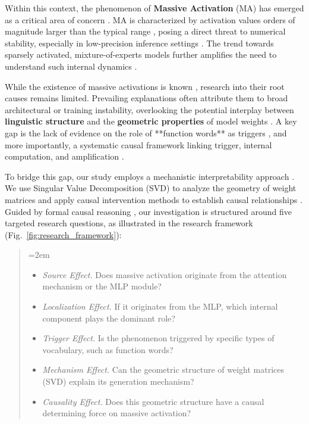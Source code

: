 \documentclass[conference]{IEEEtran}
\begin{document}
Within this context, the phenomenon of \textbf{Massive Activation} (MA) has emerged as a critical area of concern \cite{dao2024massive}. MA is characterized by activation values orders of magnitude larger than the typical range \cite{merrill2022saturated}, posing a direct threat to numerical stability, especially in low-precision inference settings \cite{liu2025alberta}. The trend towards sparsely activated, mixture-of-experts models further amplifies the need to understand such internal dynamics \cite{fedus2022switch}.

While the existence of massive activations is known \cite{dao2024massive}, research into their root causes remains limited. Prevailing explanations often attribute them to broad architectural or training instability, overlooking the potential interplay between \textbf{linguistic structure} and the \textbf{geometric properties} of model weights \cite{hewitt2019structural, tenney2019bert}. A key gap is the lack of evidence on the role of **function words** as triggers \cite{jawahar2019what}, and more importantly, a systematic causal framework linking trigger, internal computation, and amplification \cite{elhage2021mathematical}.

To bridge this gap, our study employs a mechanistic interpretability approach \cite{conmy2023towards}. We use Singular Value Decomposition (SVD) to analyze the geometry of weight matrices \cite{hao2021singular, yuan2023asvd} and apply causal intervention methods to establish causal relationships \cite{meng2022locating, bau2021identifying}. Guided by formal causal reasoning \cite{pearl2009causality}, our investigation is structured around five targeted research questions, as illustrated in the research framework (Fig.~\ref{fig:research_framework}):

\begin{quote}
{\leftskip=2em
\setlength{\leftmargini}{2.5em}
\begin{itemize}
    \item[\textcolor{magenta}{RQ1:}] \textit{Source Effect.} Does massive activation originate from the attention mechanism or the MLP module?
    \item[\textcolor{magenta}{RQ2:}] \textit{Localization Effect.} If it originates from the MLP, which internal component plays the dominant role?
    \item[\textcolor{magenta}{RQ3:}] \textit{Trigger Effect.} Is the phenomenon triggered by specific types of vocabulary, such as function words?
    \item[\textcolor{magenta}{RQ4:}] \textit{Mechanism Effect.} Can the geometric structure of weight matrices (SVD) explain its generation mechanism?
    \item[\textcolor{magenta}{RQ5:}] \textit{Causality Effect.} Does this geometric structure have a causal determining force on massive activation?
\end{itemize}
}
\end{quote}
\end{document}
